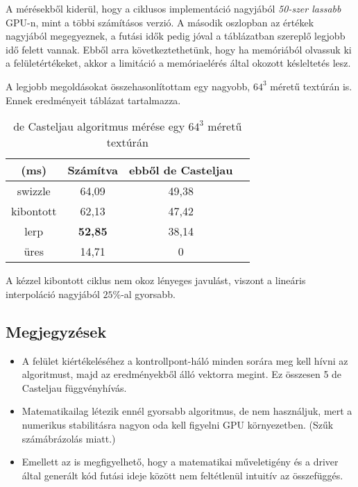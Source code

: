 A mérésekből kiderül, hogy a ciklusos implementáció nagyjából \emph{50-szer lassabb} GPU-n, mint a többi számításos verzió. A második oszlopban az értékek nagyjából megegyeznek, a futási idők pedig jóval a táblázatban szereplő legjobb idő felett vannak. Ebből arra következtethetünk, hogy ha memóriából olvassuk ki a felületértékeket, akkor a limitáció a memóriaelérés által okozott késleltetés lesz.

A legjobb megoldásokat összehasonlítottam egy nagyobb, $64^3$ méretű textúrán is. Ennek eredményeit  táblázat tartalmazza.

\begin{table}[H]
	\begin{center}
		\begin{tabular}{| c || c || c | c |}
			\hline
			(ms) & \textbf{Számítva} & \textbf{ebből de Casteljau} \\ 
			\hline\hline
			swizzle & 64,09 & 49,38 \\
			\hline
			kibontott & 62,13 & 47,42 \\
			\hline
			lerp & \textbf{52,85} & 38,14 \\
			\hline
			üres & 14,71 & 0 \\
			\hline
		\end{tabular}
	\end{center}
	\caption{de Casteljau algoritmus mérése egy $64^3$ méretű textúrán}
	\label{tab:deCasteljau2}
\end{table}

A kézzel kibontott ciklus nem okoz lényeges javulást, viszont a lineáris interpoláció nagyjából $25\%$-al gyorsabb. 


\subsection{Megjegyzések}
\begin{itemize}
	\item A felület kiértékeléséhez a kontrollpont-háló minden sorára meg kell hívni az algoritmust, majd az eredményekből álló vektorra megint. Ez összesen 5 de Casteljau függvényhívás.
	\item Matematikailag létezik ennél gyorsabb algoritmus, de nem használjuk, mert a numerikus stabilitásra nagyon oda kell figyelni GPU környezetben. (Szűk számábrázolás miatt.)
	\item Emellett az is megfigyelhető, hogy a matematikai műveletigény és a driver által generált kód futási ideje között nem feltétlenül intuitív az összefüggés.
\end{itemize}



